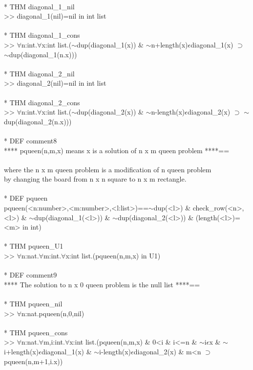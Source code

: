 \N{} \\{}
\N{}* THM diagonal\_1\_nil \\{}
\N{}      >> diagonal\_1(nil)=nil in int list \\{}
\N{} \\{}
\N{}* THM diagonal\_1\_cons \\{}
\N{}      >> \(\forall{}\)n:int.\(\forall{}\)x:int list.(\(\sim{}\)dup(diagonal\_1(x)) \& \(\sim{}\)n+length(x)\(\epsilon{}\)diagonal\_1(x) \(\supset{}\) \(\sim{}\)dup(diagonal\_1(n.x))) \\{}
\N{} \\{}
\N{}* THM diagonal\_2\_nil \\{}
\N{}      >> diagonal\_2(nil)=nil in int list \\{}
\N{} \\{}
\N{}* THM diagonal\_2\_cons \\{}
\N{}      >> \(\forall{}\)n:int.\(\forall{}\)x:int list.(\(\sim{}\)dup(diagonal\_2(x)) \& \(\sim{}\)n-length(x)\(\epsilon{}\)diagonal\_2(x) \(\supset{}\) \(\sim{}\)dup(diagonal\_2(n.x))) \\{}
\N{} \\{}
\N{}* DEF comment8 \\{}
\N{}      **** pqueen(n,m,x) means x is a solution of n x m queen problem ****== \\{}
\N{}       \\{}
\N{}      where the n x m queen problem is a modification of n queen problem \\{}
\N{}      by changing the board from n x n square to n x m rectangle. \\{}
\N{} \\{}
\N{}* DEF pqueen \\{}
\N{}      pqueen(<n:number>,<m:number>,<l:list>)==\(\sim{}\)dup(<l>) \& check\_row(<n>,<l>) \& \(\sim{}\)dup(diagonal\_1(<l>)) \& \(\sim{}\)dup(diagonal\_2(<l>)) \& (length(<l>)=<m> in int) \\{}
\N{} \\{}
\N{}* THM pqueen\_U1 \\{}
\N{}      >> \(\forall{}\)n:nat.\(\forall{}\)m:int.\(\forall{}\)x:int list.(pqueen(n,m,x) in U1) \\{}
\N{} \\{}
\N{}* DEF comment9 \\{}
\N{}      **** The solution to n x 0 queen problem is the null list ****== \\{}
\N{} \\{}
\N{}* THM pqueen\_nil \\{}
\N{}      >> \(\forall{}\)n:nat.pqueen(n,0,nil) \\{}
\N{} \\{}
\N{}* THM pqueen\_cons \\{}
\N{}      >> \(\forall{}\)n:nat.\(\forall{}\)m,i:int.\(\forall{}\)x:int list.(pqueen(n,m,x) \& 0<i \& i<=n \& \(\sim{}\)i\(\epsilon{}\)x \& \(\sim{}\)i+length(x)\(\epsilon{}\)diagonal\_1(x) \& \(\sim{}\)i-length(x)\(\epsilon{}\)diagonal\_2(x) \& m<n \(\supset{}\) pqueen(n,m+1,i.x)) \\{}
\N{} \\{}

